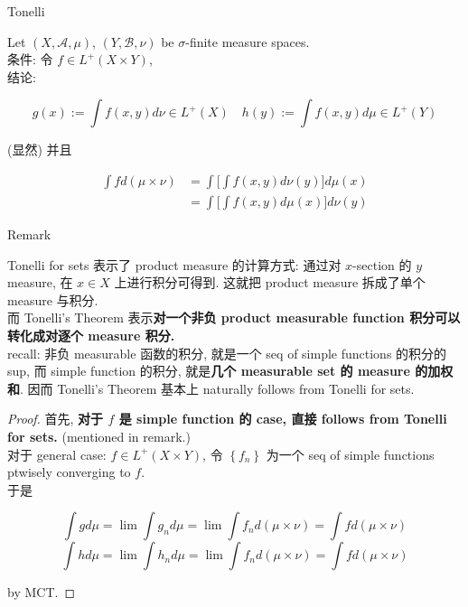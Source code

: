 \documentclass{qlnotes-export}
\begin{document}
\begin{theorem}{Tonelli}\label{thm-06-product-measure-fubini-tonelli-tonelli}

Let \((X,\mathcal{A},\mu)\), \((Y,\mathcal{B},\nu)\) be \(\sigma\)-finite measure spaces.\\
条件: 令 \(f \in L^{+}(X \times Y)\),\\
结论:

\[g(x) := \int f(x,y) d\nu \in L^{+}(X)\quad h(y) := \int f(x,y) d\mu \in L^{+}(Y)\]

(显然) 并且

\[\begin{matrix}
{\int f d(\mu \times \nu)} & {= \int\lbrack\int f(x,y) d\nu(y)\rbrack d\mu(x)} \\
 & {= \int\lbrack\int f(x,y) d\mu(x)\rbrack d\nu(y)}
\end{matrix}\]

\end{theorem}

\begin{qlremark}{Remark}

Tonelli for sets 表示了 product measure 的计算方式: 通过对 \(x\)-section 的 \(y\) measure, 在 \(x \in X\) 上进行积分可得到. 这就把 product measure 拆成了单个 measure 与积分.\\
而 Tonelli's Theorem 表示\textbf{对一个非负 product measurable function 积分可以转化成对逐个 measure 积分.}\\
recall: 非负 measurable 函数的积分, 就是一个 seq of simple functions 的积分的 sup, 而 simple function 的积分, 就是\textbf{几个 measurable set 的 measure 的加权和}. 因而 Tonelli's Theorem 基本上 naturally follows from Tonelli for sets.

\end{qlremark}

\begin{proof}

首先, \textbf{对于 \(f\) 是 simple function 的 case, 直接 follows from Tonelli for sets.} (mentioned in remark.)\\
对于 general case: \(f \in L^{+}(X \times Y)\), 令 \(\left\{ f_{n} \right\}\) 为一个 seq of simple functions ptwisely converging to \(f\).\\
于是

\[\int g d\mu = \lim\int g_{n} d\mu = \lim\int f_{n} d(\mu \times \nu) = \int f d(\mu \times \nu)\]\[\int h d\mu = \lim\int h_{n} d\mu = \lim\int f_{n} d(\mu \times \nu) = \int f d(\mu \times \nu)\]

by MCT.

\end{proof}
\end{document}
